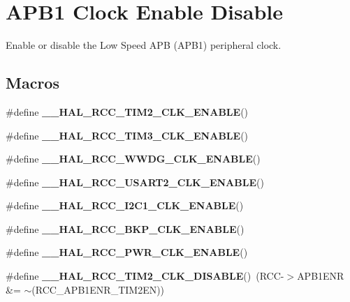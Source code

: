 \hypertarget{group___r_c_c___a_p_b1___clock___enable___disable}{}\section{A\+P\+B1 Clock Enable Disable}
\label{group___r_c_c___a_p_b1___clock___enable___disable}


Enable or disable the Low Speed A\+PB (A\+P\+B1) peripheral clock.  


\subsection*{Macros}
\begin{DoxyCompactItemize}
\item 
\#define {\bfseries \+\_\+\+\_\+\+H\+A\+L\+\_\+\+R\+C\+C\+\_\+\+T\+I\+M2\+\_\+\+C\+L\+K\+\_\+\+E\+N\+A\+B\+LE}()
\item 
\#define {\bfseries \+\_\+\+\_\+\+H\+A\+L\+\_\+\+R\+C\+C\+\_\+\+T\+I\+M3\+\_\+\+C\+L\+K\+\_\+\+E\+N\+A\+B\+LE}()
\item 
\#define {\bfseries \+\_\+\+\_\+\+H\+A\+L\+\_\+\+R\+C\+C\+\_\+\+W\+W\+D\+G\+\_\+\+C\+L\+K\+\_\+\+E\+N\+A\+B\+LE}()
\item 
\#define {\bfseries \+\_\+\+\_\+\+H\+A\+L\+\_\+\+R\+C\+C\+\_\+\+U\+S\+A\+R\+T2\+\_\+\+C\+L\+K\+\_\+\+E\+N\+A\+B\+LE}()
\item 
\#define {\bfseries \+\_\+\+\_\+\+H\+A\+L\+\_\+\+R\+C\+C\+\_\+\+I2\+C1\+\_\+\+C\+L\+K\+\_\+\+E\+N\+A\+B\+LE}()
\item 
\#define {\bfseries \+\_\+\+\_\+\+H\+A\+L\+\_\+\+R\+C\+C\+\_\+\+B\+K\+P\+\_\+\+C\+L\+K\+\_\+\+E\+N\+A\+B\+LE}()
\item 
\#define {\bfseries \+\_\+\+\_\+\+H\+A\+L\+\_\+\+R\+C\+C\+\_\+\+P\+W\+R\+\_\+\+C\+L\+K\+\_\+\+E\+N\+A\+B\+LE}()
\item 
\mbox{\label{group___r_c_c___a_p_b1___clock___enable___disable_gad2def81b1df0e62cd322ab60b31ba59f}} 
\#define {\bfseries \+\_\+\+\_\+\+H\+A\+L\+\_\+\+R\+C\+C\+\_\+\+T\+I\+M2\+\_\+\+C\+L\+K\+\_\+\+D\+I\+S\+A\+B\+LE}()~(R\+CC-\/$>$A\+P\+B1\+E\+NR \&= $\sim$(R\+C\+C\+\_\+\+A\+P\+B1\+E\+N\+R\+\_\+\+T\+I\+M2\+EN))
\item 
\mbox{\label{group___r_c_c___a_p_b1___clock___enable___disable_ga9fb7035f007ec272b725e51018a36b23}} 

\end{DoxyCompactItemize}
